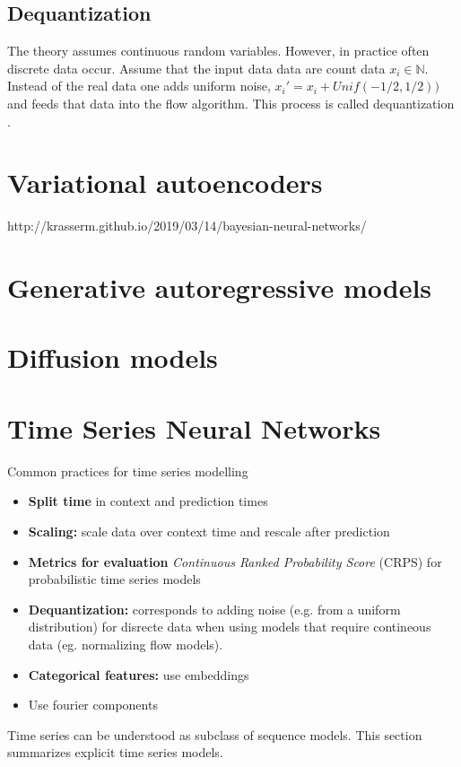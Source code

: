 \documentclass[12pt,a4paper]{article}
\begin{document}
\subsection{Dequantization}
The theory assumes continuous random variables. However, in practice often discrete data occur. Assume that the input data data are count data $x_i \in \mathbb{N}$. Instead of the real data one adds uniform noise, $x_i' =  x_i + Unif(-1/2, 1/2))$ and feeds that data into the flow algorithm. This process is called dequantization \cite{theis_2015_dequant, ho_2019_flow_pp}.

\section{Variational autoencoders}
\cite{Kingma_2019_AnIntroductionToVariationalAutoencoders}
http://krasserm.github.io/2019/03/14/bayesian-neural-networks/
\section{Generative autoregressive models}
\section{Diffusion models}


\section{Time Series Neural Networks}
Common practices for time series modelling
\begin{itemize}
	\item \textbf{Split time} in context and prediction times
	\item \textbf{Scaling:} scale data over context time and rescale after prediction
	\item \textbf{Metrics for evaluation} \textit{Continuous Ranked Probability Score} (CRPS) for probabilistic time series models
	\item \textbf{Dequantization:} corresponds to adding noise (e.g. from a uniform distribution) for disrecte data when using models that require contineous data (eg. normalizing flow models).
	\item \textbf{Categorical features:} use embeddings 
	\item Use fourier components 
\end{itemize}
Time series can be understood as subclass of sequence models. This section summarizes explicit time series models.
\end{document}
